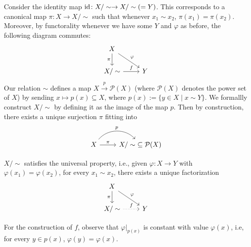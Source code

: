 Consider the identity map $\operatorname{id} \colon X / \sim \to X / \sim(=Y)$. This corresponds to a canonical map $\pi \colon X \to X / \sim$ such that whenever $x_1 \sim x_2$, $\pi(x_1)=\pi(x_2)$. Moreover, by functorality whenever we have some $Y$ and $\varphi $ as before, the following diagram commutes:
\[
\begin{tikzcd}
    X\arrow[d,"\pi"'] \arrow[rd,"\varphi "]& \\
    X / \sim \arrow[r,"f"]& Y
\end{tikzcd}
\] 
Our relation $\sim$ defines a map $X \xrightarrow{p} \mathcal{P} (X)$ (where $\mathcal{P} (X)$ denotes the power set of $X$) by sending $x \mapsto p(x)\subseteq X$, where $p(x):= \{y \in X \mid x \sim Y\} $. We formallly construct $X / \sim $ by defining it as the image of the map $p$. Then by construction, there exists a unique surjection $\pi$ fitting into \[
\begin{tikzcd}
    X \arrow[r, "\pi"] \arrow[r, "p", bend left=49] & X/\sim \ \subseteq \mathcal P(X)
\end{tikzcd}
\] 
\begin{claim}
    $X / \sim $ satisfies the universal property, i.e., given $\varphi  \colon X \to Y$ with $\varphi (x_1)=\varphi (x_2)$, for every $x_1 \sim x_2$, there exists a unique factorization \[
    \begin{tikzcd}
X \arrow[rd, "\varphi"] \arrow[d, "\pi"'] &   \\
X/\sim \arrow[r, "f", dotted]             & Y        
    \end{tikzcd}
    \] 
\end{claim}
For the construction of $f$, observe that $\left. \varphi \right| _{p(x)} $ is constant with value $\varphi (x)$, i.e, for every $y \in p(x)$, $\varphi (y)=\varphi (x)$. 

